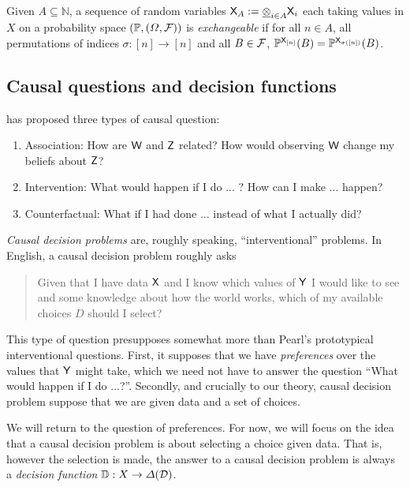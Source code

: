 \begin{definition}[Exchangeability]
Given $A\subseteq \mathbb{N}$, a sequence of random variables $\mathsf{X}_A:=\underline{\otimes}_{i\in A} \mathsf{X}_i$ each taking values in $X$ on a probability space $(\mathbb{P},(\Omega,\mathcal{F}))$ is \emph{exchangeable} if for all $n\in A$, all permutations of indices $\sigma:[n]\to[n]$ and all  $B \in\mathcal{F}$, $\mathbb{P}^{\mathsf{X}_{[n]}}(B) =\mathbb{P}^{\mathsf{X}_{\sigma([n])}}(B)$.

\end{definition}

\subsection{Causal questions and decision functions}

\citet{pearl_book_2018} has proposed three types of causal question:
\begin{enumerate}
    \item Association: How are $\mathsf{W}$ and $\mathsf{Z}$ related? How would observing $\mathsf{W}$ change my beliefs about $\mathsf{Z}$?
    \item Intervention: What would happen if I do ... ? How can I make ... happen?
    \item Counterfactual: What if I had done ... instead of what I actually did?
\end{enumerate}

\emph{Causal decision problems} are, roughly speaking, ``interventional'' problems. In English, a causal decision problem roughly asks

\begin{quote}
    Given that I have data $\mathsf{X}$ and I know which values of $\mathsf{Y}$ I would like to see and some knowledge about how the world works, which of my available choices $D$ should I select?
\end{quote}

This type of question presupposes somewhat more than Pearl's prototypical interventional questions. First, it supposes that we have \emph{preferences} over the values that $\mathsf{Y}$ might take, which we need not have to answer the question ``What would happen if I do ...?''. Secondly, and crucially to our theory, causal decision problem suppose that we are given data and a set of choices. 

We will return to the question of preferences. For now, we will focus on the idea that a causal decision problem is about selecting a choice given data. That is, however the selection is made, the answer to a causal decision problem is always a \emph{decision function} $\mathbb{D}:X\to \Delta(\mathcal{D})$.

